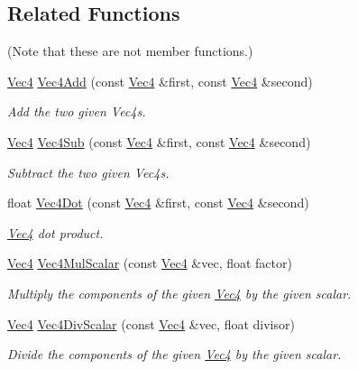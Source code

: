 \subsection*{Related Functions}
(Note that these are not member functions.) {\bf }\par
\begin{DoxyCompactItemize}
\item 
\hyperlink{classgofxmath_1_1_vec4}{Vec4} \hyperlink{classgofxmath_1_1_vec4_a8812efd4565ada77e6dab63828ad715b}{Vec4\+Add} (const \hyperlink{classgofxmath_1_1_vec4}{Vec4} \&first, const \hyperlink{classgofxmath_1_1_vec4}{Vec4} \&second)
\begin{DoxyCompactList}\small\item\em Add the two given Vec4s. \end{DoxyCompactList}\item 
\hyperlink{classgofxmath_1_1_vec4}{Vec4} \hyperlink{classgofxmath_1_1_vec4_a01968b83532d01613a8f89659d4a52dc}{Vec4\+Sub} (const \hyperlink{classgofxmath_1_1_vec4}{Vec4} \&first, const \hyperlink{classgofxmath_1_1_vec4}{Vec4} \&second)
\begin{DoxyCompactList}\small\item\em Subtract the two given Vec4s. \end{DoxyCompactList}\item 
float \hyperlink{classgofxmath_1_1_vec4_a2deb01c8dd6f1a06c0a0cfc2e96e9c1e}{Vec4\+Dot} (const \hyperlink{classgofxmath_1_1_vec4}{Vec4} \&first, const \hyperlink{classgofxmath_1_1_vec4}{Vec4} \&second)
\begin{DoxyCompactList}\small\item\em \hyperlink{classgofxmath_1_1_vec4}{Vec4} dot product. \end{DoxyCompactList}\item 
\hyperlink{classgofxmath_1_1_vec4}{Vec4} \hyperlink{classgofxmath_1_1_vec4_a70441f2888f0df752fe0624a5a7b362d}{Vec4\+Mul\+Scalar} (const \hyperlink{classgofxmath_1_1_vec4}{Vec4} \&vec, float factor)
\begin{DoxyCompactList}\small\item\em Multiply the components of the given \hyperlink{classgofxmath_1_1_vec4}{Vec4} by the given scalar. \end{DoxyCompactList}\item 
\hyperlink{classgofxmath_1_1_vec4}{Vec4} \hyperlink{classgofxmath_1_1_vec4_a670f1f6ebdadeaa2f656f153218fdee8}{Vec4\+Div\+Scalar} (const \hyperlink{classgofxmath_1_1_vec4}{Vec4} \&vec, float divisor)
\begin{DoxyCompactList}\small\item\em Divide the components of the given \hyperlink{classgofxmath_1_1_vec4}{Vec4} by the given scalar. \end{DoxyCompactList}\item 

\end{DoxyCompactItemize}

